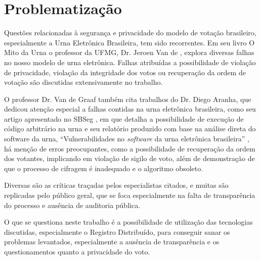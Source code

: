 \chapter{Problematização}
Questões relacionadas à segurança e privacidade do modelo de votação brasileiro, especialmente a Urna Eletrônica Brasileira, tem sido recorrentes. Em seu livro O Mito da Urna o professor da UFMG, Dr. Jeroen Van de , explora diversas falhas no nosso modelo de urna eletrônica. Falhas atribuídas a possibilidade de violação de privacidade, violação da integridade dos votos ou recuperação da ordem de votação são discutidas extensivamente no trabalho.  

O professor Dr. Van de Graaf também cita trabalhos do Dr. Diego Aranha, que dedicou atenção especial a falhas contidas na urna eletrônica brasileira, como seu artigo apresentado no SBSeg \cite{Aranha2018}, em que detalha a possibilidade de execução de código arbitrário na urna e seu relatório produzido com base na análise direta do software da urna, “Vulnerabilidades no \textit{software} da urna eletrônica brasileira” \cite{AranhaKMS14}, há menção de erros preocupantes, como a possibilidade de recuperação da ordem dos votantes, implicando em violação de sigilo de voto, além de demonstração de que o processo de cifragem é inadequado e o algoritmo obsoleto. 

Diversas são as críticas traçadas pelos especialistas citados, e muitas são replicadas pelo público geral,  que se foca especialmente na falta de transparência do processo e ausência de auditoria pública. 

O que se questiona neste trabalho é a possibilidade de utilização das tecnologias discutidas, especialmente o Registro Distribuído, para conseguir sanar os problemas levantados, especialmente a ausência de transparência e os questionamentos quanto a privacidade do voto.  